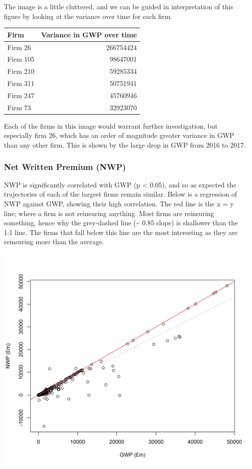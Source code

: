 \documentclass[
]{article}
\begin{document}
The image is a little cluttered, and we can be guided in interpretation
of this figure by looking at the variance over time for each firm.

\begin{longtable}[]{@{}lr@{}}
\toprule
Firm & Variance in GWP over time\tabularnewline
\midrule
\endhead
Firm 26 & 266754424\tabularnewline
Firm 105 & 98647001\tabularnewline
Firm 210 & 59285334\tabularnewline
Firm 311 & 50751941\tabularnewline
Firm 247 & 45760946\tabularnewline
Firm 73 & 32923070\tabularnewline
\bottomrule
\end{longtable}

Each of the firms in this image would warrant further investigation, but
especially firm 26, which has an order of magnitude greater variance in
GWP than any other firm. This is shown by the large drop in GWP from
2016 to 2017.

\hypertarget{net-written-premium-nwp}{%
\subsubsection{Net Written Premium
(NWP)}\label{net-written-premium-nwp}}

NWP is significantly correlated with GWP (p \textless{} 0.05), and so as
expected the trajectories of each of the largest firms remain similar.
Below is a regression of NWP against GWP, showing their high
correlation. The red line is the x = y line; where a firm is not
reinsuring anything. Most firms are reinsuring something, hence why the
grey-dashed line (\textasciitilde{} 0.85 slope) is shallower than the
1:1 line. The firms that fall below this line are the most interesting
as they are reinsuring more than the average.

\includegraphics[width=1\linewidth]{../figs/regression_nwp_gwp}
\end{document}
